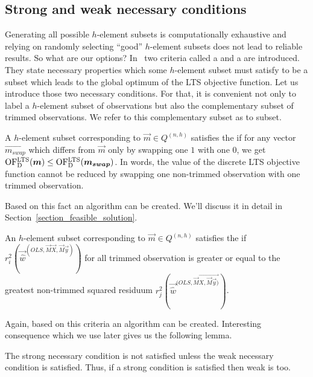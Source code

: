 \subsection{Strong and weak necessary conditions}
Generating all possible $h$-element subsets is computationally exhaustive and relying on randomly selecting  ``good'' $h$-element subsets does not lead to reliable results. So what are our options? In~\cite{hawkins1999improved} two criteria called a  and a  are introduced. They state necessary properties which some $h$-element subset must satisfy to be a subset which leads to the global optimum of the LTS objective function. Let us introduce those two necessary conditions. For that, it is convenient not only to label a $h$-element subset of  observations but also the complementary subset of trimmed observations. We refer to this complementary subset as to  subset.

\begin{definition} \label{strong_condition}
 A $h$-element subset corresponding to $\vec{m} \in Q^{(n, h)}$ satisfies  the  if for any vector $\vec{m_{swap}}$ which differs from $\vec{m}$ only by swapping one $1$ with one $0$, we get  $\operatorname{OF^{LTS}_D}(\boldsymbol{m}) \leq \operatorname{OF^{LTS}_D}(\boldsymbol{m_{swap}})$. In words, the value of the discrete LTS objective function cannot be reduced by swapping one non-trimmed observation with one trimmed observation.
\end{definition}

Based on this fact an algorithm can be created. We'll discuss it in detail in Section~\ref{section_feasible_solution}.

\begin{definition}
An $h$-element subset corresponding to $\vec{m} \in Q^{(n, h)}$ satisfies the  if 
$r_i^2(\vec{\hat{w}}^{(OLS,\vec{M}\vec{X}, \vec{M}\vec{y})} )$ for all trimmed observation is greater or equal to the greatest non-trimmed squared residuum $r_j^2(\vec{\hat{w}}^{(OLS,\vec{M}\vec{X, \vec{M}\vec{y})} })$.
\end{definition}    
Again, based on this criteria an algorithm can be created. Interesting consequence which we use later gives us the following lemma.

\begin{lemma} \label{lemma_conditions}
    The strong necessary condition is not satisfied unless the weak necessary condition is satisfied. Thus, if a strong condition is satisfied then weak is too. 
\end{lemma}

